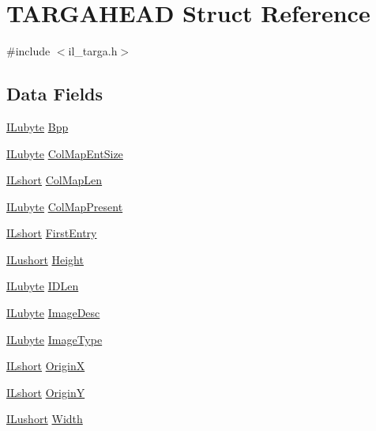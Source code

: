 \hypertarget{struct_t_a_r_g_a_h_e_a_d}{\section{T\-A\-R\-G\-A\-H\-E\-A\-D Struct Reference}
\label{struct_t_a_r_g_a_h_e_a_d}
}


{\ttfamily \#include $<$il\-\_\-targa.\-h$>$}

\subsection*{Data Fields}
\begin{DoxyCompactItemize}
\item 
\hyperlink{il_8h_a8d2f04500100a86d1b00e98ab1b15a33}{I\-Lubyte} \hyperlink{struct_t_a_r_g_a_h_e_a_d_acb619433784a0e26c0f1f18b3700c9f7}{Bpp}
\item 
\hyperlink{il_8h_a8d2f04500100a86d1b00e98ab1b15a33}{I\-Lubyte} \hyperlink{struct_t_a_r_g_a_h_e_a_d_a923f37800640c3174bf138296bb884dd}{Col\-Map\-Ent\-Size}
\item 
\hyperlink{il_8h_afc75ded918970afe7517d3f7f0561db3}{I\-Lshort} \hyperlink{struct_t_a_r_g_a_h_e_a_d_a11a0c17b913eb9e3e4fd773cc0e8ce58}{Col\-Map\-Len}
\item 
\hyperlink{il_8h_a8d2f04500100a86d1b00e98ab1b15a33}{I\-Lubyte} \hyperlink{struct_t_a_r_g_a_h_e_a_d_a88ee3d8ce5bc858820dbe57ee62e108b}{Col\-Map\-Present}
\item 
\hyperlink{il_8h_afc75ded918970afe7517d3f7f0561db3}{I\-Lshort} \hyperlink{struct_t_a_r_g_a_h_e_a_d_afd98576de45146027f3111152cf6f946}{First\-Entry}
\item 
\hyperlink{il_8h_af6287b43748354a7c4864da43ae56962}{I\-Lushort} \hyperlink{struct_t_a_r_g_a_h_e_a_d_ab74e2bb7cc7272180be796817440ae4e}{Height}
\item 
\hyperlink{il_8h_a8d2f04500100a86d1b00e98ab1b15a33}{I\-Lubyte} \hyperlink{struct_t_a_r_g_a_h_e_a_d_acfccc20e3915cad79332d7842531bebc}{I\-D\-Len}
\item 
\hyperlink{il_8h_a8d2f04500100a86d1b00e98ab1b15a33}{I\-Lubyte} \hyperlink{struct_t_a_r_g_a_h_e_a_d_a25856ce4a16e529ac814618bfac8d667}{Image\-Desc}
\item 
\hyperlink{il_8h_a8d2f04500100a86d1b00e98ab1b15a33}{I\-Lubyte} \hyperlink{struct_t_a_r_g_a_h_e_a_d_a6ac711b43a661505fca04ba332c6cf9b}{Image\-Type}
\item 
\hyperlink{il_8h_afc75ded918970afe7517d3f7f0561db3}{I\-Lshort} \hyperlink{struct_t_a_r_g_a_h_e_a_d_a5f0122d081e7fac0ae1faa51d48ab6ef}{Origin\-X}
\item 
\hyperlink{il_8h_afc75ded918970afe7517d3f7f0561db3}{I\-Lshort} \hyperlink{struct_t_a_r_g_a_h_e_a_d_a35ff566adf72cc2055bcb03190e2b190}{Origin\-Y}
\item 
\hyperlink{il_8h_af6287b43748354a7c4864da43ae56962}{I\-Lushort} \hyperlink{struct_t_a_r_g_a_h_e_a_d_aed0f0a923b8346ba51a4de45fff77ee7}{Width}
\end{DoxyCompactItemize}


